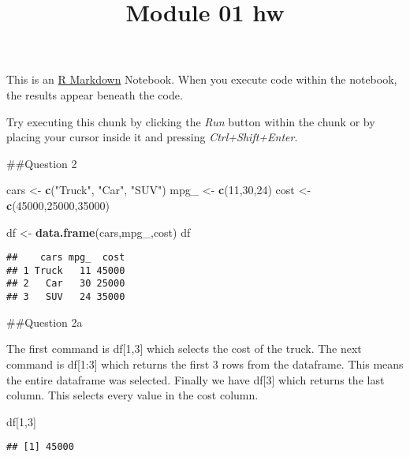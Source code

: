 \documentclass[
]{article}
\title{Module 01 hw}
\author{}
\date{\vspace{-2.5em}}
\newenvironment{Shaded}{\begin{snugshade}}{\end{snugshade}}
\newcommand{\DecValTok}[1]{\textcolor[rgb]{0.00,0.00,0.81}{#1}}
\newcommand{\FunctionTok}[1]{\textcolor[rgb]{0.13,0.29,0.53}{\textbf{#1}}}
\newcommand{\NormalTok}[1]{#1}
\newcommand{\OtherTok}[1]{\textcolor[rgb]{0.56,0.35,0.01}{#1}}
\newcommand{\StringTok}[1]{\textcolor[rgb]{0.31,0.60,0.02}{#1}}
\begin{document}
\maketitle

This is an \href{http://rmarkdown.rstudio.com}{R Markdown} Notebook.
When you execute code within the notebook, the results appear beneath
the code.

Try executing this chunk by clicking the \emph{Run} button within the
chunk or by placing your cursor inside it and pressing
\emph{Ctrl+Shift+Enter}.

\#\#Question 2

\begin{Shaded}
\begin{Highlighting}[]
\NormalTok{cars }\OtherTok{\textless{}{-}} \FunctionTok{c}\NormalTok{(}\StringTok{"Truck"}\NormalTok{, }\StringTok{"Car"}\NormalTok{, }\StringTok{"SUV"}\NormalTok{)}
\NormalTok{mpg\_ }\OtherTok{\textless{}{-}} \FunctionTok{c}\NormalTok{(}\DecValTok{11}\NormalTok{,}\DecValTok{30}\NormalTok{,}\DecValTok{24}\NormalTok{)}
\NormalTok{cost }\OtherTok{\textless{}{-}} \FunctionTok{c}\NormalTok{(}\DecValTok{45000}\NormalTok{,}\DecValTok{25000}\NormalTok{,}\DecValTok{35000}\NormalTok{)}

\NormalTok{df }\OtherTok{\textless{}{-}} \FunctionTok{data.frame}\NormalTok{(cars,mpg\_,cost)}
\NormalTok{df}
\end{Highlighting}
\end{Shaded}

\begin{verbatim}
##    cars mpg_  cost
## 1 Truck   11 45000
## 2   Car   30 25000
## 3   SUV   24 35000
\end{verbatim}

\#\#Question 2a

The first command is df{[}1,3{]} which selects the cost of the truck.
The next command is df{[}1:3{]} which returns the first 3 rows from the
dataframe. This means the entire dataframe was selected. Finally we have
df{[}3{]} which returns the last column. This selects every value in the
cost column.

\begin{Shaded}
\begin{Highlighting}[]
\NormalTok{df[}\DecValTok{1}\NormalTok{,}\DecValTok{3}\NormalTok{]}
\end{Highlighting}
\end{Shaded}

\begin{verbatim}
## [1] 45000
\end{verbatim}
\end{document}
